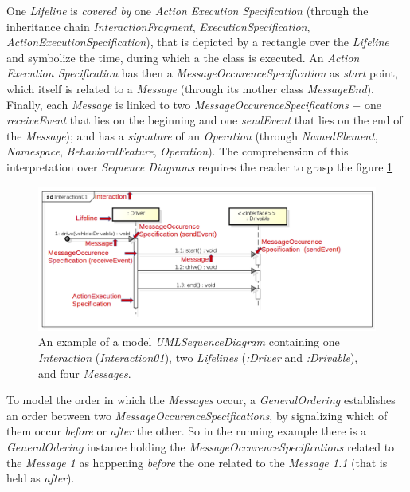 \documentclass[tuberlin,cic,tc,english,noabntcite]{iiufrgs}
\begin{document}
One \emph{Lifeline} is \emph{covered by} one \emph{Action Execution Specification} (through the inheritance chain \emph{InteractionFragment}, \emph{ExecutionSpecification}, \emph{ActionExecutionSpecification}), that is depicted by a rectangle over the \emph{Lifeline} and symbolize the time, during which a the class is executed. An \emph{Action Execution Specification} has then a \emph{MessageOccurenceSpecification} as \emph{start} point, which itself is related to a \emph{Message} (through its mother class \emph{MessageEnd}). Finally, each \emph{Message} is linked to  two \emph{MessageOccurenceSpecifications} $-$ one \emph{receiveEvent} that lies on the beginning and one \emph{sendEvent} that lies on the end of the \emph{Message}); and has a \emph{signature} of an \emph{Operation} (through \emph{NamedElement}, \emph{Namespace}, \emph{BehavioralFeature}, \emph{Operation}). The comprehension of this interpretation over \emph{Sequence Diagrams} requires the reader to grasp the figure \ref{fig:uml_metamodel_sequence_example}

\begin{figure}[h]
    \caption{An example of a model \emph{UMLSequenceDiagram} containing one \emph{Interaction} (\emph{Interaction01}), two \emph{Lifelines} (\emph{:Driver} and \emph{:Drivable}), and four \emph{Messages}.}
    \begin{center}
        \includegraphics[width=\textwidth]{umlSequenceDiagramExample01}
    \end{center}
    \label{fig:uml_metamodel_sequence_example}
\end{figure}

To model the order in which the \emph{Messages} occur, a \emph{GeneralOrdering} establishes an order between two \emph{MessageOccurenceSpecifications}, by signalizing which of them occur \emph{before} or \emph{after} the other. So in the running example there is a \emph{GeneralOdering} instance holding the \emph{MessageOccurenceSpecifications} related to the \emph{Message 1} as happening \emph{before} the one related to the \emph{Message 1.1} (that is held as \emph{after}).
\end{document}
